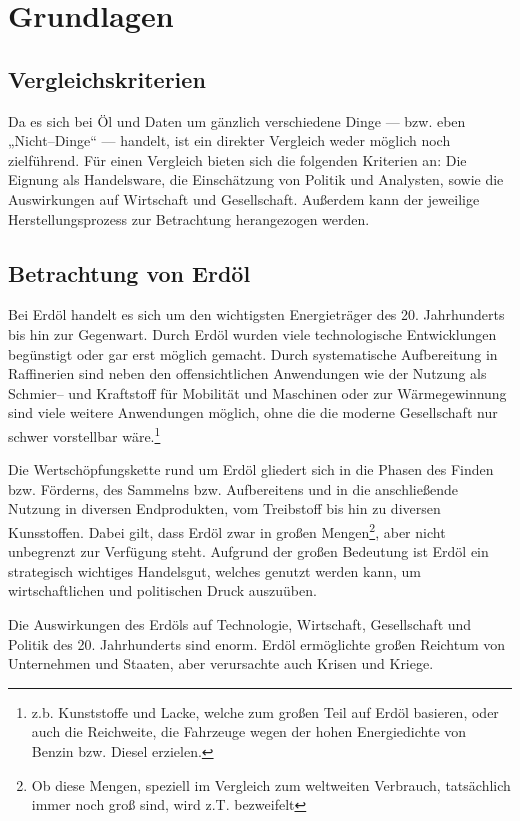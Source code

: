 \section{Grundlagen}
\label{sec:grundlagen}

\subsection{Vergleichskriterien}

Da es sich bei Öl und Daten um gänzlich verschiedene Dinge --- bzw. eben „Nicht--Dinge“ --- handelt, ist ein direkter Vergleich weder möglich noch zielführend. Für einen Vergleich bieten sich die folgenden Kriterien an: Die Eignung als Handelsware, die Einschätzung von Politik und Analysten, sowie die Auswirkungen auf Wirtschaft und Gesellschaft. Außerdem kann der jeweilige Herstellungsprozess zur Betrachtung herangezogen werden. 

\subsection{Betrachtung von Erdöl}

Bei Erdöl handelt es sich um den wichtigsten Energieträger des 20. Jahrhunderts bis hin zur Gegenwart. Durch Erdöl wurden viele technologische Entwicklungen begünstigt oder gar erst möglich gemacht. Durch systematische Aufbereitung in Raffinerien sind neben den offensichtlichen Anwendungen wie der Nutzung als Schmier-- und Kraftstoff für Mobilität und Maschinen oder zur Wärmegewinnung sind viele weitere Anwendungen möglich, ohne die die moderne Gesellschaft nur schwer vorstellbar wäre.\footnote{z.b. Kunststoffe und Lacke, welche zum großen Teil auf Erdöl basieren, oder auch die Reichweite, die Fahrzeuge wegen der hohen Energiedichte von Benzin bzw. Diesel erzielen.}

Die Wertschöpfungskette rund um Erdöl gliedert sich in die Phasen des Finden bzw. Förderns, des Sammelns bzw. Aufbereitens und in die anschließende Nutzung in diversen Endprodukten, vom Treibstoff bis hin zu diversen Kunsstoffen.
Dabei gilt, dass Erdöl zwar in großen Mengen\footnote{Ob diese Mengen, speziell im Vergleich zum weltweiten Verbrauch, tatsächlich immer noch groß sind, wird z.T. bezweifelt}, aber nicht unbegrenzt zur Verfügung steht. Aufgrund der großen Bedeutung ist Erdöl ein strategisch wichtiges Handelsgut, welches genutzt werden kann, um wirtschaftlichen und politischen Druck auszuüben.

Die Auswirkungen des Erdöls auf Technologie, Wirtschaft, Gesellschaft und Politik des 20. Jahrhunderts sind enorm. Erdöl ermöglichte großen Reichtum von Unternehmen und Staaten, aber verursachte auch Krisen und Kriege.

